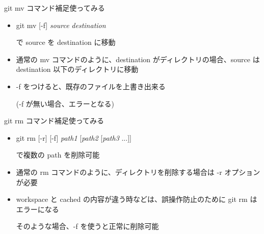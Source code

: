 \begin{frame}



\end{frame}


\begin{frame}[t]{git mv コマンド補足}{使ってみる}

  \begin{itemize}
  \item git mv [-f] \textit{source} \textit{destination}

    で source を destination に移動
    \vspace{2ex}

  \item 通常の mv コマンドのように、destination がディレクトリの場合、source は destination 以下のディレクトリに移動
    \vspace{2ex}

  \item -f をつけると、既存のファイルを上書き出来る

    (-f が無い場合、エラーとなる)
  \end{itemize}

\end{frame}


\begin{frame}[t]{git rm コマンド補足}{使ってみる}

  \begin{itemize}
  \item git rm [-r] [-f] \textit{path1} [\textit{path2} [\textit{path3} ...]]

    で複数の path を削除可能
    \vspace{2ex}

  \item 通常の rm コマンドのように、ディレクトリを削除する場合は -r オプションが必要
    \vspace{2ex}

  \item workspace と cached の内容が違う時などは、誤操作防止のために git rm はエラーになる

    そのような場合、-f を使うと正常に削除可能
  \end{itemize}

\end{frame}
